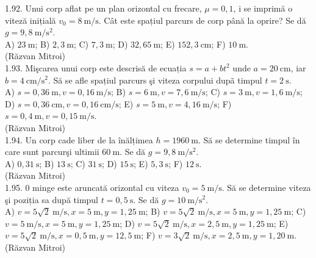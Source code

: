 1.92. Unui corp aflat pe un plan orizontal cu frecare, $\mu=0,1$, i se imprimă o viteză inițială $v_{0}=8 \mathrm{~m} / \mathrm{s}$. Cât este spațiul parcurs de corp până la oprire? Se dă $g=9,8 \mathrm{~m} / \mathrm{s}^{2}$.\\ A) $23 \mathrm{~m}$; B) $2,3 \mathrm{~m}$; C) $7,3 \mathrm{~m}$; D) $32,65 \mathrm{~m}$; E) $152,3 \mathrm{~cm}$; F) $10 \mathrm{~m}$.\\ (Răzvan Mitroi)\\

1.93. Mişcarea unui corp este descrisă de ecuația $s=a+b t^{2}$ unde $a=20 \mathrm{~cm}$, iar $b=4 \mathrm{~cm} / \mathrm{s}^{2}$. Să se afle spațiul parcurs şi viteza corpului dupã timpul $t=2 \mathrm{~s}$.\\ A) $s=0,36 \mathrm{~m}, v=0,16 \mathrm{~m} / \mathrm{s}$; B) $s=6 \mathrm{~m}, v=7,6 \mathrm{~m} / \mathrm{s}$; C) $s=3 \mathrm{~m}, v=1,6 \mathrm{~m} / \mathrm{s}$; D) $s=0,36 \mathrm{~cm}, v=0,16 \mathrm{~cm} / \mathrm{s}$; E) $s=5 \mathrm{~m}, v=4,16 \mathrm{~m} / \mathrm{s}$; F) $s=0,4 \mathrm{~m}, v=0,15 \mathrm{~m} / \mathrm{s}$.\\ (Răzvan Mitroi)\\

1.94. Un corp cade liber de la înălțimea $h=1960 \mathrm{~m}$. Să se determine timpul în care sunt parcurşi ultimii $60 \mathrm{~m}$. Se dă $g=9,8 \mathrm{~m} / \mathrm{s}^{2}$.\\ A) $0,31 \mathrm{~s}$; B) $13 \mathrm{~s}$; C) $31 \mathrm{~s}$; D) $15 \mathrm{~s}$; E) $5,3 \mathrm{~s}$; F) $12 \mathrm{~s}$.\\ (Răzvan Mitroi)\\

1.95. 0 minge este aruncată orizontal cu viteza $v_{0}=5 \mathrm{~m} / \mathrm{s}$. Să se determine viteza şi poziția sa după timpul $t=0,5 \mathrm{~s}$. Se dă $g=10 \mathrm{~m} / \mathrm{s}^{2}$.\\ A) $v=5 \sqrt{2} \mathrm{~m} / \mathrm{s}, x=5 \mathrm{~m}, y=1,25 \mathrm{~m}$; B) $v=5 \sqrt{2} \mathrm{~m} / \mathrm{s}, x=5 \mathrm{~m}, y=1,25 \mathrm{~m}$; C) $v=5 \mathrm{~m} / \mathrm{s}, x=5 \mathrm{~m}, y=1,25 \mathrm{~m}$; D) $v=5 \sqrt{2} \mathrm{~m} / \mathrm{s}, x=2,5 \mathrm{~m}, y=1,25 \mathrm{~m}$; E) $v=5 \sqrt{2} \mathrm{~m} / \mathrm{s}, x=0,5 \mathrm{~m}, y=12,5 \mathrm{~m}$; F) $v=3 \sqrt{2} \mathrm{~m} / \mathrm{s}, x=2,5 \mathrm{~m}, y=1,20 \mathrm{~m}$.\\ (Răzvan Mitroi)\\

